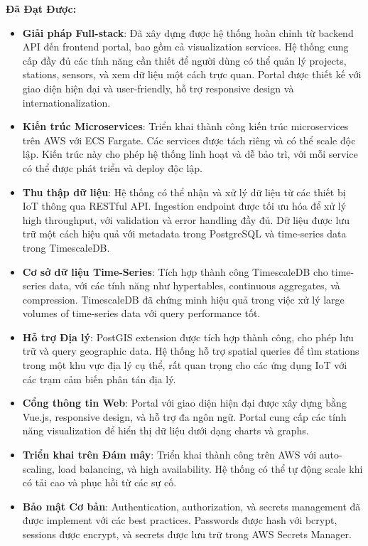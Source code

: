 \textbf{Đã Đạt Được:}
\begin{itemize}
    \item \textbf{Giải pháp Full-stack}: Đã xây dựng được hệ thống hoàn chỉnh từ backend API đến frontend portal, bao gồm cả visualization services. Hệ thống cung cấp đầy đủ các tính năng cần thiết để người dùng có thể quản lý projects, stations, sensors, và xem dữ liệu một cách trực quan. Portal được thiết kế với giao diện hiện đại và user-friendly, hỗ trợ responsive design và internationalization.
    
    \item \textbf{Kiến trúc Microservices}: Triển khai thành công kiến trúc microservices trên AWS với ECS Fargate. Các services được tách riêng và có thể scale độc lập. Kiến trúc này cho phép hệ thống linh hoạt và dễ bảo trì, với mỗi service có thể được phát triển và deploy độc lập.
    
    \item \textbf{Thu thập dữ liệu}: Hệ thống có thể nhận và xử lý dữ liệu từ các thiết bị IoT thông qua RESTful API. Ingestion endpoint được tối ưu hóa để xử lý high throughput, với validation và error handling đầy đủ. Dữ liệu được lưu trữ một cách hiệu quả với metadata trong PostgreSQL và time-series data trong TimescaleDB.
    
    \item \textbf{Cơ sở dữ liệu Time-Series}: Tích hợp thành công TimescaleDB cho time-series data, với các tính năng như hypertables, continuous aggregates, và compression. TimescaleDB đã chứng minh hiệu quả trong việc xử lý large volumes of time-series data với query performance tốt.
    
    \item \textbf{Hỗ trợ Địa lý}: PostGIS extension được tích hợp thành công, cho phép lưu trữ và query geographic data. Hệ thống hỗ trợ spatial queries để tìm stations trong một khu vực địa lý cụ thể, rất quan trọng cho các ứng dụng IoT với các trạm cảm biến phân tán địa lý.
    
    \item \textbf{Cổng thông tin Web}: Portal với giao diện hiện đại được xây dựng bằng Vue.js, responsive design, và hỗ trợ đa ngôn ngữ. Portal cung cấp các tính năng visualization để hiển thị dữ liệu dưới dạng charts và graphs.
    
    \item \textbf{Triển khai trên Đám mây}: Triển khai thành công trên AWS với auto-scaling, load balancing, và high availability. Hệ thống có thể tự động scale khi có tải cao và phục hồi từ các sự cố.
    
    \item \textbf{Bảo mật Cơ bản}: Authentication, authorization, và secrets management đã được implement với các best practices. Passwords được hash với bcrypt, sessions được encrypt, và secrets được lưu trữ trong AWS Secrets Manager.
\end{itemize}

